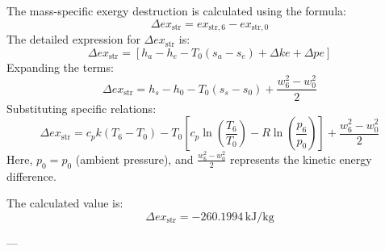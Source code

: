 The mass-specific exergy destruction is calculated using the formula:  
\[
\Delta ex_{\text{str}} = ex_{\text{str},6} - ex_{\text{str},0}
\]  
The detailed expression for \(\Delta ex_{\text{str}}\) is:  
\[
\Delta ex_{\text{str}} = [h_a - h_e - T_0(s_a - s_e) + \Delta ke + \Delta pe]
\]  
Expanding the terms:  
\[
\Delta ex_{\text{str}} = h_s - h_0 - T_0(s_s - s_0) + \frac{w_6^2 - w_0^2}{2}
\]  
Substituting specific relations:  
\[
\Delta ex_{\text{str}} = c_p k(T_6 - T_0) - T_0[c_p \ln\left(\frac{T_6}{T_0}\right) - R \ln\left(\frac{p_6}{p_0}\right)] + \frac{w_6^2 - w_0^2}{2}
\]  
Here, \(p_0 = p_0\) (ambient pressure), and \(\frac{w_6^2 - w_0^2}{2}\) represents the kinetic energy difference.  

The calculated value is:  
\[
\Delta ex_{\text{str}} = -260.1994 \, \text{kJ/kg}
\]  

---